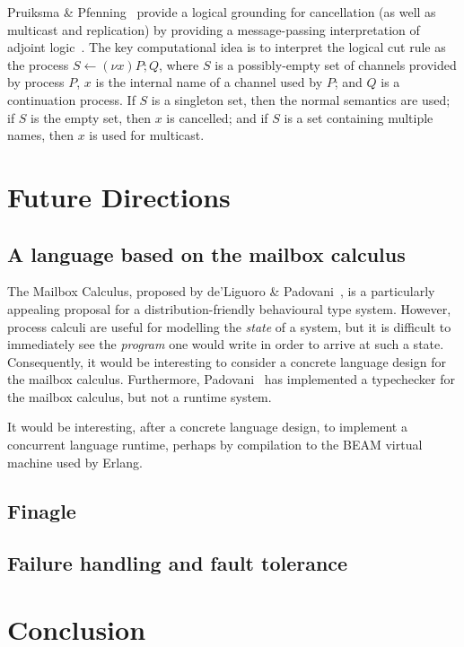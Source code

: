 \documentclass[
graybox,
envcountchap
]{svmult}
\begin{document}
\begin{bibunit}
  Pruiksma \& Pfenning~\cite{PruiksmaP19:mp-adjoint} provide a logical grounding
  for cancellation (as well as multicast and replication) by providing a
  message-passing interpretation of adjoint logic~\cite{PruiksmaCPR18:adjoint}.
  The key computational idea is to interpret the logical cut rule as the process
  $S \leftarrow (\nu x) P; Q$, where $S$ is a possibly-empty set of channels
  provided by process $P$, $x$ is the internal name of a channel used by $P$;
  and $Q$ is a continuation process. If $S$ is a singleton set, then the normal
  semantics are used; if $S$ is the empty set, then $x$ is cancelled; and if $S$
  is a set containing multiple names, then $x$ is used for multicast.

  \section{Future Directions}\label{sec:bt:future}

  \subsection{A language based on the mailbox calculus}
  The Mailbox Calculus, proposed by de'Liguoro \&
  Padovani~\cite{deLiguoroP18:mailbox}, is a particularly
  appealing proposal for a distribution-friendly behavioural type system.
  However, process calculi are useful for modelling the \emph{state} of a
  system, but it is difficult to immediately see the \emph{program} one would
  write in order to arrive at such a state. Consequently, it would be
  interesting to consider a concrete language design for the mailbox calculus.
  Furthermore, Padovani~\cite{Padovani18:mc2} has implemented a typechecker for
  the mailbox calculus, but not a runtime system.

  It would be interesting, after a concrete language design, to implement a
  concurrent language runtime, perhaps by compilation to the BEAM virtual
  machine used by Erlang.


  \subsection{Finagle}
  \subsection{Failure handling and fault tolerance}

  \section{Conclusion}\label{sec:bt:conclusion}


\end{bibunit}
\end{document}
